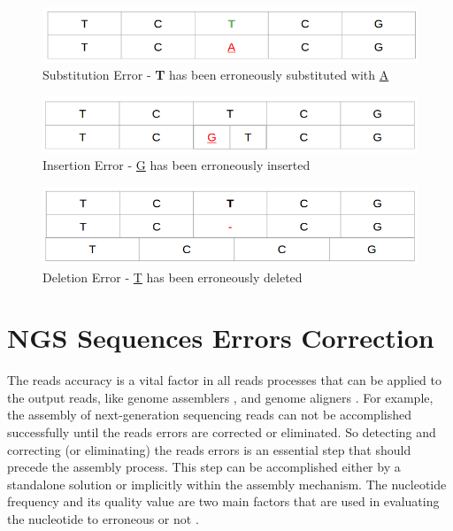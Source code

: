 \documentclass[12pt,openany]{llncs}
\begin{document}
\begin{figure}
	\centering
	\includegraphics[width=.911\linewidth]{./figs/ErrCrr-1}
	\caption{\label{fig:fig-ErrCrr-1}{Substitution Error} - \textbf{T} has been erroneously substituted with \underline{A}}
\end{figure}
\vspace{2cm}
\begin{figure}
	\centering
	\includegraphics[width=.911\linewidth]{./figs/ErrCrr-2}
	\caption{\label{fig:fig-ErrCrr-2}{Insertion Error} - \underline{G} has been erroneously inserted}
\end{figure}
\vspace{2cm}
\begin{figure}
	\centering
	\includegraphics[width=.911\linewidth]{./figs/ErrCrr-3}
	\caption{\label{fig:fig-ErrCrr-3}{Deletion Error} - \underline{T} has been erroneously deleted}
\end{figure}


\newpage
\section{NGS Sequences Errors Correction}
The reads accuracy is a vital factor in all reads processes that can be applied to the output reads, like genome assemblers \cite{assembly,assembly1}, and genome aligners \cite{alignment}. For example, the assembly of next-generation sequencing reads can not be accomplished successfully until the reads errors are corrected or eliminated. So detecting and correcting (or eliminating) the reads errors is an essential step that should precede the assembly process. This step can be accomplished either by a standalone solution or implicitly within the assembly mechanism. The nucleotide frequency and its quality value are two main factors that are used in evaluating the nucleotide to erroneous or not \cite{ErrCorr,ErrCorr1}. 
\end{document}
